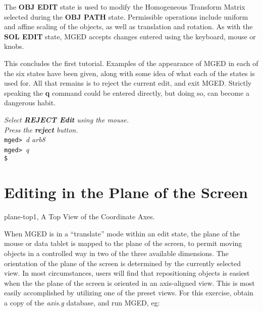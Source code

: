 The {\bf OBJ EDIT} state is used to modify the
Homogeneous Transform Matrix selected during the {\bf OBJ PATH} state.
Permissible operations include uniform and affine scaling of the objects,
as well as translation and rotation.
As with the {\bf SOL EDIT} state, MGED accepts changes entered using
the keyboard, mouse or knobs.

This concludes the first tutorial.  Examples of the appearance of MGED
in each of the six states have been given, along with some idea of what
each of the states is used for.  All that remains is to reject the current
edit, and exit MGED.  Strictly speaking the {\bf q} command could be entered
directly, but doing so, can become a dangerous habit.

\noindent
{\em Select {\bf REJECT Edit} using the mouse.}\\
{\em Press the {\bf reject} button.}\\
{\tt mged> }{\em d arb8}\\
{\tt mged> }{\em q}\\
{\tt \$ }\\

\section{Editing in the Plane of the Screen}
\mfig plane-top1, A Top View of the Coordinate Axes.

When MGED is in a ``translate'' mode within an edit state,
the plane of the mouse or data tablet is mapped to
the plane of the screen, to permit moving objects in a
controlled way in two of the three available dimensions.
The orientation of the plane of the screen is determined by the
currently selected view.
In most circumstances, users will find that repositioning objects
is easiest when the the plane of the screen is oriented in an
axis-aligned view.  This is most easily accomplished by utilizing
one of the preset views.
For this exercise, obtain a copy of the {\em axis.g} database,
and run MGED, eg:


